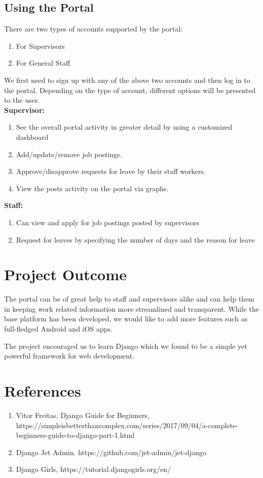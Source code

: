 \documentclass[14pt]{extarticle}
\begin{document}
\newpage

\subsection{Using the Portal}
There are two types of accounts supported by the portal:
\begin{enumerate}
    \item For Supervisors
    \item For General Staff
\end{enumerate}
We first need to sign up with any of the above two accounts and then log in to the portal. Depending on the type of account, different options will be presented to the user. \\
\newline
\textbf{Supervisor:}
\begin{enumerate}
    \item See the overall portal activity in greater detail by using a customized dashboard
    \item Add/update/remove job postings.
    \item Approve/disapprove requests for leave by their staff workers.
    \item View the posts activity on the portal via graphs.
\end{enumerate}
\textbf{Staff:}
\begin{enumerate}
    \item Can view and apply for job postings posted by supervisors
    \item Request for leaves by specifying the number of days and the reason for leave
\end{enumerate}

\section{Project Outcome}
The portal can be of great help to staff and supervisors alike and can help them in keeping work related information more streamlined and transparent. While the base platform has been developed, we would like to add more features such as full-fledged Android and iOS apps.

The project encouraged us to learn Django which we found to be a simple yet powerful framework for web development. 

\section{References}
\begin{enumerate}
    \item Vitor Freitas, Django Guide for Beginners, \newline https://simpleisbetterthancomplex.com/series/2017/09/04/a-complete-beginners-guide-to-django-part-1.html
    \item Django Jet Admin. https://github.com/jet-admin/jet-django
    \item Django Girls, https://tutorial.djangogirls.org/en/
\end{enumerate}
\end{document}
